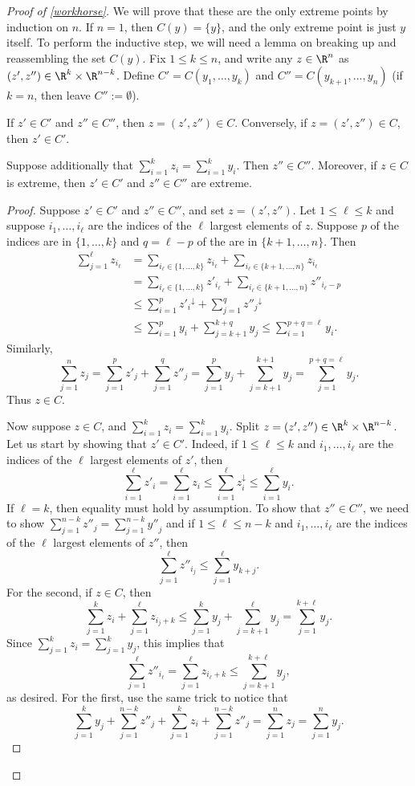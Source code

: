 \documentclass[12pt]{amsart}
\begin{document}
\begin{proof}[Proof of \cref{workhorse}]
We will prove that these are the only extreme points by induction on $n$. If $n=1$, then $C(y) = \{y\}$, and the only extreme point is just $y$ itself. To perform the inductive step, we will need a lemma on breaking up and reassembling the set $C(y)$. Fix $1 \leq k \leq n$, and write any $z\in \R^n$ as $(z',z'') \in \R^{k}\times \R^{n-k}$. Define $C' = C(y_1,\ldots,y_k)$ and $C'' = C(y_{k+1},\ldots,y_n)$ (if $k = n$, then leave $C'' := \emptyset$).
\begin{lemt}
If $z' \in C'$ and $z'' \in C''$, then $z = (z',z'') \in C$. Conversely, if $z = (z',z'') \in C$, then $z' \in C'$. 

Suppose additionally that $\sum_{i=1}^k z_i = \sum_{i=1}^k y_i$. Then $z'' \in C''$. Moreover, if $z \in C$ is extreme, then $z' \in C'$ and $z'' \in C''$ are extreme.
\end{lemt}
\begin{proof}
Suppose $z' \in C'$ and $z'' \in C''$, and set $z = (z',z'')$. Let $1 \leq \ell \leq k$ and suppose $i_1,\ldots,i_\ell$ are the indices of the $\ell$ largest elements of $z$. Suppose $p$ of the indices are in $\{1,\ldots,k\}$ and $q = \ell-p$ of the are in $\{k+1,\ldots,n\}$. Then
\begin{align*}
\sum_{j = 1}^{\ell} z_{i_\ell} &= \sum_{i_\ell \in \{1,\ldots,k\}} z_{i_\ell} + \sum_{i_\ell \in \{k+1,\ldots,n\}} z_{i_\ell}\\
&= \sum_{i_\ell \in \{1,\ldots,k\}} z'_{i_\ell} + \sum_{i_\ell \in \{k+1,\ldots,n\}} z''_{i_\ell-p}\\
&\leq \sum_{i=1}^p {z'_{i}}^{\downarrow} + \sum_{j= 1}^q {z''_j}^{\downarrow}\\
&\leq \sum_{i=1}^p y_i + \sum_{j=k+1}^{k+q} y_j \leq \sum_{i=1}^{p+q=\ell} y_i.\end{align*}
Similarly,
\[\sum_{j=1}^n z_j = \sum_{j=1}^p z'_j + \sum_{j=1}^q z''_j = \sum_{j=1}^p y_j + \sum_{j=k+1}^{k+1} y_j = \sum_{j=1}^{p+q=\ell}y_j.\]
Thus $z \in C$.

Now suppose $z \in C$, and $\sum_{i=1}^k z_i = \sum_{i=1}^k y_i$. Split $z = (z',z'')\in \R^{k}\times \R^{n-k}$. Let us start by showing that $z' \in C'$. Indeed, if $1 \leq \ell \leq k$ and $i_1,\ldots,i_\ell$ are the indices of the $\ell$ largest elements of $z'$, then
\[\sum_{i=1}^{\ell} z'_i = \sum_{i=1}^\ell z_i \leq \sum_{i=1}^{\ell} z^\downarrow_i \leq \sum_{i=1}^\ell y_i.\] If $\ell = k$, then equality must hold by assumption. To show that $z'' \in C''$, we need to show $\sum_{j=1}^{n-k} z''_j = \sum_{j=1}^{n-k} {y''}_j$ and if $1 \leq \ell \leq n-k$ and $i_1,\ldots, i_\ell$ are the indices of the $\ell$ largest elements of $z''$, then
\[\sum_{j=1}^\ell z''_{i_j} \leq \sum_{j=1}^\ell y_{k+j}.\]
For the second, if $z \in C$, then
\[\sum_{j=1}^k z_i + \sum_{j=1}^{\ell} z_{i_j + k} \leq \sum_{j=1}^{k} y_j + \sum_{j={k+1}}^{\ell} y_j =\sum_{j=1}^{k+\ell} y_j  .\] Since $\sum_{j=1}^k z_i = \sum_{j=1}^k y_j$, this implies that
\[\sum_{j=1}^{\ell} z''_{i_\ell} = \sum_{j=1}^{\ell} z_{i_\ell + k} \leq \sum_{j=k+1}^{k+\ell} y_j,\] as desired. For the first, use the same trick to notice that
\[\sum_{j=1}^k y_j + \sum_{j=1}^{n-k} z''_{j}+\sum_{j=1}^k z_i + \sum_{j=1}^{n-k} z''_{j} = \sum_{j=1}^n z_j = \sum_{j=1}^n y_j.\]


\end{proof}
\end{proof}
\end{document}
